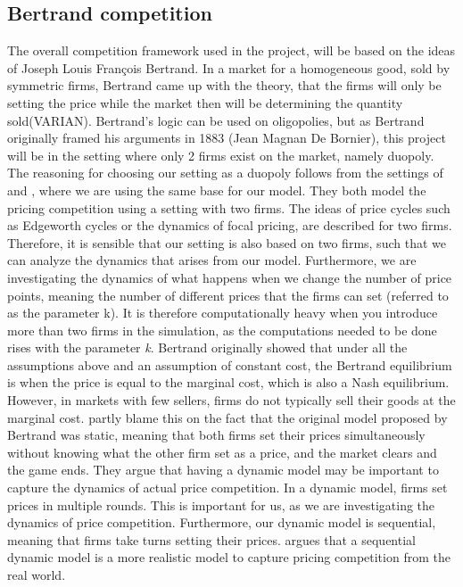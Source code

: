 \documentclass{article}
\begin{document}
\subsection{Bertrand competition}
The overall competition framework used in the project, will be based on the ideas of Joseph Louis François Bertrand. In a market for a homogeneous good, sold by symmetric firms, Bertrand came up with the theory, that the firms will only be setting the price while the market then will be determining the quantity sold(VARIAN). Bertrand's logic can be used on oligopolies, but as Bertrand originally framed his arguments in 1883 (Jean Magnan De Bornier), this project will be in the setting where only 2 firms exist on the market, namely duopoly. 
\newline
The reasoning for choosing our setting as a duopoly follows from the settings of \cite{MaskinTirole} and \cite{Klein2021},
where we are using the same base for our model. They both model the pricing competition using a setting with two firms. The ideas of price cycles such as Edgeworth cycles or the dynamics of focal pricing, are described for two firms. Therefore, it is sensible that our setting is also based on two firms, such that we can analyze the dynamics that arises from our model.
Furthermore, we are investigating the dynamics of what happens when we change the number of price points, meaning the number of different prices that the firms can set (referred to as the parameter k). It is therefore computationally heavy when you introduce more than two firms in the simulation, as the computations needed to be done rises with the parameter \textit{k}.  
\newline
Bertrand originally showed that under all the assumptions above and an assumption of constant cost, the Bertrand equilibrium is when the price is equal to the marginal cost, which is also a Nash equilibrium. However, in markets with few sellers, firms do not typically sell their goods at the marginal cost. 
\cite{MaskinTirole} partly blame this on the fact that the original model proposed by Bertrand was static, meaning that both firms set their prices simultaneously without knowing what the other firm set as a price, and the market clears and the game ends. They argue that having a dynamic model may be important to capture the dynamics of actual price competition. \cite{MaskinTirole}
In a dynamic model, firms set prices in multiple rounds. This is important for us, as we are investigating the dynamics of price competition.  
\newline
Furthermore, our dynamic model is sequential, meaning that firms take turns setting their prices. \cite{Klein2021} argues that a sequential dynamic model is a more realistic model to capture pricing competition from the real world.
\end{document}
